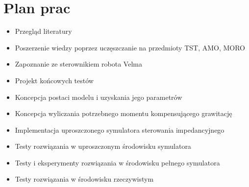 \documentclass[12pt,a4paper]{article}
\begin{document}
	\section{Plan prac}
	\begin{itemize}
		\item Przegląd literatury
		\item Poszerzenie wiedzy poprzez uczęszczanie na przedmioty TST, AMO, MORO
		\item Zapoznanie ze sterownikiem robota Velma
		\item Projekt końcowych testów
		\item Koncepcja postaci modelu i uzyskania jego parametrów
		\item Koncepcja wyliczania potrzebnego momentu kompensującego grawitację
		\item Implementacja uproszczonego symulatora sterowania impedancyjnego
		\item Testy rozwiązania w uproszczonym środowisku symulatora
		\item Testy i eksperymenty rozwiązania w środowisku pełnego symulatora
		\item Testy rozwiązania w środowisku rzeczywistym
	\end{itemize}


	
	
\end{document}
